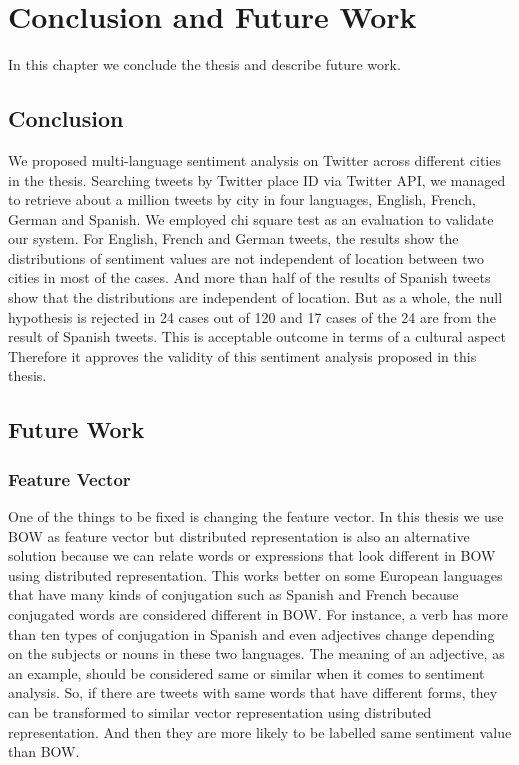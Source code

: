 \chapter{Conclusion and Future Work}
In this chapter we conclude the thesis and describe future work.
\section{Conclusion}
We proposed multi-language sentiment analysis on Twitter across different cities in the thesis.
Searching tweets by Twitter place ID via Twitter API, we managed to retrieve about a million tweets by city in four languages, English, French, German and Spanish.
We employed chi square test as an evaluation to validate our system.
For English, French and German tweets, the results show the distributions of sentiment values  are not independent of location between two cities in most of the cases.
And more than half of the results of Spanish tweets show that the distributions are independent of location. 
But as a whole, the null hypothesis is rejected in 24 cases out of 120 and 17 cases of the 24 are from the result of Spanish tweets.
This is acceptable outcome in terms of a cultural aspect
Therefore it approves the validity of this sentiment analysis proposed in this thesis.


\section{Future Work}
\subsection{Feature Vector}
One of the things to be fixed is changing the feature vector.
In this thesis we use BOW as feature vector but distributed representation is also an alternative solution because we can relate words or expressions that look different in BOW using distributed representation.
This works better on some European languages that have many kinds of conjugation such as Spanish and French because conjugated words are considered different in BOW. 
For instance, a verb has more than ten types of conjugation in Spanish and even adjectives change depending on the subjects or nouns in these two languages.
The meaning of an adjective, as an example, should be considered same or similar when it comes to sentiment analysis.
So, if there are tweets with same words that have different forms, they can be transformed to similar vector representation using distributed representation.
And then they are more likely to be labelled same sentiment value than BOW.


